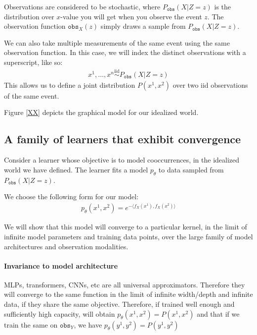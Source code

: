 Observations are considered to be stochastic, where $P_\texttt{obs}(X | Z = z)$ is the distribution over $x$-value you will get when you observe the event $z$. The observation function $\texttt{obs}_X(z)$ simply draws a sample from $P_\texttt{obs}(X | Z = z)$.

We can also take multiple measurements of the same event using the same observation function. In this case, we will index the distinct observations with a superscript, like so:
\begin{align}
    x^1, \ldots, x^n \stackrel{\text{iid}}{\sim} P_\texttt{obs}(X | Z = z)
\end{align}
This allows us to define a joint distribution $P(x^1,x^2)$ over two iid observations of the same event.%

Figure \ref{XX} depicts the graphical model for our idealized world.

\subsection{A family of learners that exhibit convergence}
Consider a learner whose objective is to model cooccurrences, in the idealized world we have defined. The learner fits a model $p_{\theta}$ to data sampled from $P_{\texttt{obs}}(X | Z=z)$. 

We choose the following form for our model:
\begin{align}
    p_{\theta}(x^1,x^2) = e^{-\langle f_X(x^1), f_X(x^2) \rangle} \label{eqn:coccurrence_model}
\end{align}

We will show that this model will converge to a particular kernel, in the limit of infinite model parameters and training data points, over the large family of model architectures and observation modalities.

\paragraph{Invariance to model architecture} MLPs, transformers, CNNs, etc are all universal approximators. Therefore they will converge to the same function in the limit of infinite width/depth and infinite data, if they share the same objective. Therefore, if trained well enough and sufficiently high capacity, will obtain $p_{\theta}(x^1,x^2) = P(x^1, x^2)$ and that if we train the same on $\texttt{obs}_Y$, we have $p_{\theta}(y^1,y^2) = P(y^1, y^2)$

